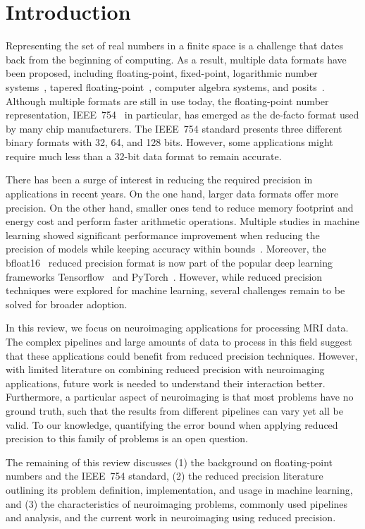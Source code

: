 \chapter{Introduction}
\label{ch:introduction}

Representing the set of real numbers in a finite space is a challenge that dates back from the beginning of computing.
As a result, multiple data formats have been proposed, including floating-point, fixed-point, 
logarithmic number systems~\cite{Kingsbury1971-kx}, tapered floating-point~\cite{Morris1971-qg}, 
computer algebra systems, and posits~\cite{Gustafson2017-wo}.
Although multiple formats are still in use today, the floating-point number 
representation, IEEE~754~\cite{ieee754_2008-ev} in particular, has emerged as 
the de-facto format used by many chip manufacturers.
The IEEE~754 standard presents three different binary formats with 32, 64, and 128 bits.
However, some applications might require much less than a 32-bit data format to
remain accurate.

There has been a surge of interest in reducing the required precision in applications in recent years.
On the one hand, larger data formats offer more precision.
On the other hand, smaller ones tend to reduce memory footprint and energy cost
and perform faster arithmetic operations.
Multiple studies in machine learning showed significant performance improvement when reducing
the precision of models while keeping accuracy within bounds~\cite{Johnson2018-up,Wang2018-oo,Lesser2011-mn,Chen2018-an,Judd2015-kw,Vicuna2021-mw}.
Moreover, the bfloat16~\cite{bfloat16} reduced precision format is now part of the
popular deep learning frameworks Tensorflow~\cite{tensorflow2015-whitepaper} and PyTorch~\cite{PyTorch_2019}.
However, while reduced precision techniques were explored for machine learning,
several challenges remain to be solved for broader adoption.

In this review, we focus on neuroimaging applications for processing MRI data.
The complex pipelines and large amounts of data to process in this field suggest that these
applications could benefit from reduced precision techniques.
However, with limited literature on combining reduced precision with neuroimaging
applications, future work is needed to understand their interaction better.
Furthermore, a particular aspect of neuroimaging is that most problems have no
ground truth,  such that the results from different pipelines can vary yet all be valid.
To our knowledge, quantifying the error bound when applying reduced precision to
this family of problems is an open question.

The remaining of this review discusses (1) the background on floating-point numbers
and the IEEE~754 standard, (2) the reduced precision literature outlining its
problem definition, implementation, and usage in machine learning, and (3) the
characteristics of neuroimaging problems, commonly used pipelines and analysis,
and the current work in neuroimaging using reduced precision.
